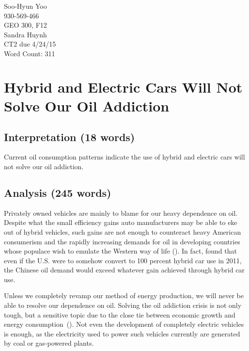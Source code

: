 \documentclass[12pt,letterpaper]{article}
\renewcommand{\citep}[1]{(\cite{#1})}
\begin{document}
%

Soo-Hyun Yoo \\
930-569-466 \\
GEO 300, F12 \\
Sandra Huynh \\
CT2 due 4/24/15 \\
Word Count: 311

\section*{Hybrid and Electric Cars Will Not Solve Our Oil Addiction}

\subsection*{Interpretation (18 words)}

Current oil consumption patterns indicate the use of hybrid and electric cars
will not solve our oil addiction.

\subsection*{Analysis (245 words)}

Privately owned vehicles are mainly to blame for our heavy dependence on oil.
Despite what the small efficiency gains auto manufacturers may be able to eke
out of hybrid vehicles, such gains are not enough to counteract heavy American
consumerism and the rapidly increasing demands for oil in developing countries
whose populace wish to emulate the Western way of life \citep{yetiv2011}. In
fact, \cite{yetiv2011} found that even if the U.S. were to somehow convert to
100 percent hybrid car use in 2011, the Chinese oil demand would exceed
whatever gain achieved through hybrid car use.

Unless we completely revamp our method of energy production, we will never be
able to resolve our dependence on oil. Solving the oil addiction crisis is not
only tough, but a sensitive topic due to the close tie between economic growth
and energy consumption~\citep{halkos2011}. Not even the development of
completely electric vehicles is enough, as the electricity used to power such
vehicles currently are generated by coal or gas-powered plants.
\end{document}
